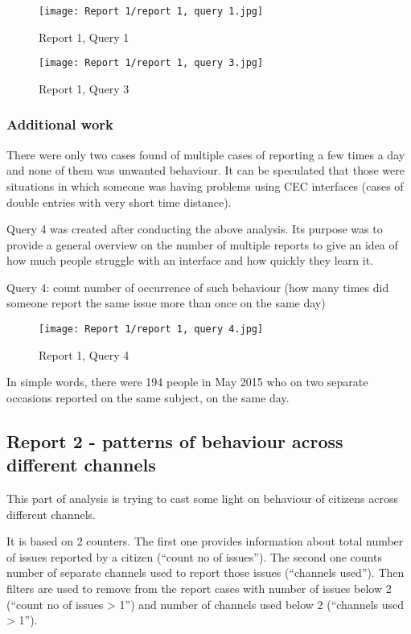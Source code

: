 \begin{figure}[hp]
\centering
     \texttt{[image: Report 1/report 1, query 1.jpg]}
      \caption{Report 1, Query 1}
       \label{normal_case}
\end{figure}

\begin{figure}[hp]
\centering
     \texttt{[image: Report 1/report 1, query 3.jpg]}
      \caption{Report 1, Query 3}
       \label{normal_case}
\end{figure}
			
			\subsubsection{Additional work}
			
There were only two cases found of multiple cases of reporting a few times a day and none of them was unwanted behaviour. It can be speculated that those were situations in which someone was having problems using CEC interfaces (cases of double entries with very short time distance).

Query 4 was created after conducting the above analysis. Its purpose was to provide a general overview on the number of multiple reports to give an idea of how much people struggle with an interface and how quickly they learn it.

Query 4: count number of occurrence of such behaviour (how many times did someone report the same issue more than once on the same day)


\begin{figure}[hp]
\centering
     \texttt{[image: Report 1/report 1, query 4.jpg]}
      \caption{Report 1, Query 4}
       \label{normal_case}
\end{figure}

In simple words, there were 194 people in May 2015 who on two separate occasions reported on the same subject, on the same day.
			
		\subsection{Report 2 - patterns of behaviour across different channels}
		
This part of analysis is trying to cast some light on behaviour of citizens across different channels.

It is based on 2 counters. The first one provides information about total number of issues reported by a citizen (“count no of issues”). The second one counts number of separate channels used to report those issues (“channels used”). Then filters are used to remove from the report cases with number of issues below 2 (“count no of issues > 1”) and number of channels used below 2 (“channels used > 1”).

